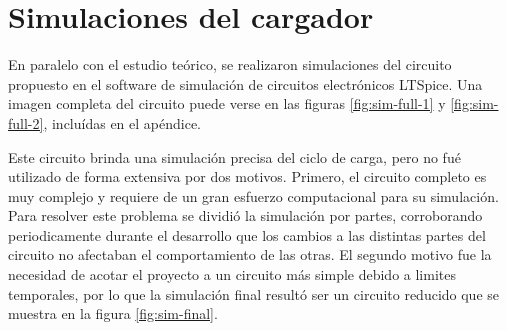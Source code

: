 \section{Simulaciones del cargador}

En paralelo con el estudio teórico, se realizaron simulaciones del circuito propuesto en el software de simulación de circuitos electrónicos LTSpice.
Una imagen completa del circuito puede verse en las figuras \ref{fig:sim-full-1} y \ref{fig:sim-full-2}, incluídas en el apéndice.

Este circuito brinda una simulación precisa del ciclo de carga, pero no fué utilizado de forma extensiva por dos motivos.
Primero, el circuito completo es muy complejo y requiere de un gran esfuerzo computacional para su simulación.
Para resolver este problema se dividió la simulación por partes,
corroborando periodicamente durante el desarrollo que los cambios a las distintas partes del circuito no afectaban el comportamiento de las otras.
El segundo motivo fue la necesidad de acotar el proyecto a un circuito más simple debido a limites temporales,
por lo que la simulación final resultó ser un circuito reducido que se muestra en la figura \ref{fig:sim-final}.

